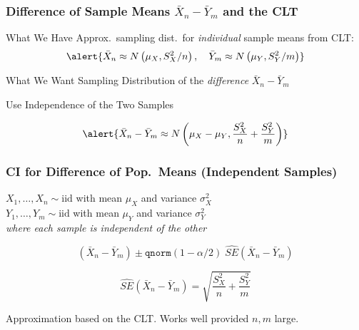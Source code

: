 \begin{frame}
\frametitle{Difference of Sample Means $\bar{X}_n-\bar{Y}_m$ and the CLT}
\begin{block}{What We Have}
Approx.\ sampling dist.\ for \emph{individual}  sample means from CLT:
\[\alert{\bar{X}_n\approx N\left(\mu_X, S_X^2/n\right), \quad \bar{Y}_m\approx N\left(\mu_Y, S_Y^2/m\right)}\]
\end{block}

\begin{block}{What We Want}
Sampling Distribution of the \emph{difference} $\bar{X}_n - \bar{Y}_m$
\end{block}

\begin{block}{Use Independence of the Two Samples}
  
  \[\alert{\bar{X}_n - \bar{Y}_m\approx N\left( \mu_X - \mu_Y, \displaystyle \frac{S_X^2}{n} + \frac{S_Y^2}{m}\right)}\]

\end{block}


\end{frame}
\begin{frame}
\frametitle{CI for Difference of Pop.\ Means (Independent Samples)}

$X_1, \hdots, X_n \sim \mbox{iid}$ with mean $\mu_X$ and variance $\sigma_X^2$\\ $Y_1, \hdots, Y_m \sim \mbox{iid}$ with mean $\mu_Y$ and variance $\sigma_Y^2$\\
\emph{where each sample is independent of the other } 

\[\left(\bar{X}_n - \bar{Y}_m\right) \pm \texttt{qnorm}(1-\alpha/2)\; \widehat{SE}(\bar{X}_n - \bar{Y}_m)\]

  \[
    \widehat{SE}(\bar{X}_n - \bar{Y}_m) = \sqrt{\frac{S_X^2}{n} + \frac{S_Y^2}{m}}
  \]

	\alert{Approximation based on the CLT. Works well provided $n,m$ large.}
\end{frame}

